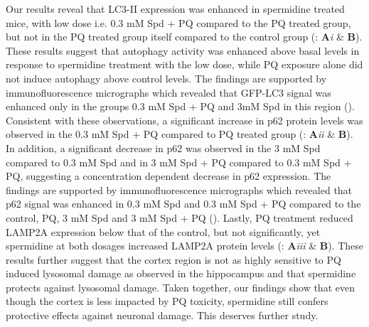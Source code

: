 Our results reveal that LC3-II expression was enhanced in spermidine treated mice, with low dose i.e. 0.3 mM Spd + PQ compared to the PQ treated group, but not in the PQ treated group itself compared to the control group (: \textbf{A}\textit{i} \& \textbf{B}). These results suggest that autophagy activity was enhanced above basal levels in response to spermidine treatment with the low dose, while PQ exposure alone did not induce autophagy above control levels. The findings are supported by immunofluorescence micrographs which revealed that GFP-LC3 signal was enhanced only in the groups 0.3 mM Spd + PQ and 3mM Spd in this region (). Consistent with these observations, a significant increase in p62 protein levels was observed in the 0.3 mM Spd + PQ compared to PQ treated group (: \textbf{A}\textit{ii} \& \textbf{B}). In addition, a significant decrease in p62 was observed in the 3 mM Spd compared to 0.3 mM Spd  and in 3 mM Spd + PQ compared to 0.3 mM Spd + PQ, suggesting a concentration dependent decrease in p62 expression. The findings are supported by immunofluorescence micrographs which revealed that p62 signal was enhanced in 0.3 mM Spd and 0.3 mM Spd + PQ compared to the control, PQ, 3 mM Spd and 3 mM Spd + PQ (). Lastly, PQ treatment reduced LAMP2A expression below that of the control, but not significantly, yet spermidine at both dosages increased LAMP2A protein levels (: \textbf{A}\textit{iii} \& \textbf{B}). These results further suggest that the cortex region is not as highly sensitive to PQ induced lysosomal damage as observed in the hippocampus and that spermidine protects against lysosomal damage. Taken together, our findings show that even though the cortex is less impacted by PQ toxicity, spermidine still confers protective effects against neuronal damage.  This deserves further study.